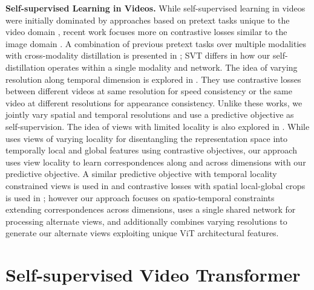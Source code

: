 \documentclass[10pt,twocolumn,letterpaper]{article}
\begin{document}
\textbf{Self-supervised Learning in Videos.}
While self-supervised learning in videos were initially dominated by approaches based on pretext tasks unique to the video domain \cite{mathieu2015deep, PatrauceanHC16, walker2016uncertain, pmlr-v37-srivastava15, Vondrick16a, vondrick2018tracking, Agrawal_2015_ICCV, Goroshin_2015_ICCV, DBLP:journals/corr/IsolaZKA15, Misra-2016-5596, 7410677}, recent work focuses more on contrastive losses similar to the image domain \cite{Feichtenhofer_large, han2019video, han2020self, qian2020spatiotemporal, hjelm2020representation, recasens2021broaden}. 
A combination of previous pretext tasks over multiple modalities with cross-modality distillation is presented in \cite{piergiovanni2020evolving};  SVT differs in how our self-distillation operates within a single modality and network.
The idea of varying resolution along temporal dimension is explored in \cite{Huang_2021_ICCV, chen2021rspnet}. They use contrastive losses between different videos at same resolution for speed consistency or the same video at different resolutions for appearance consistency. Unlike these works, we jointly vary spatial and temporal resolutions and use a predictive objective as self-supervision.  The idea of views with limited locality is also explored in \cite{Behrmann2021LongSV, recasens2021broaden, Dave2021TCLRTC}. While \cite{Behrmann2021LongSV} uses views of varying locality for disentangling the representation space into temporally local and global features using contrastive objectives, our approach uses view locality to learn correspondences along and across dimensions with our predictive objective. A similar predictive objective with temporal locality constrained views is used in \cite{recasens2021broaden} and contrastive losses with spatial local-global crops is used in \cite{Dave2021TCLRTC}; however our approach focuses on spatio-temporal constraints extending correspondences across dimensions, uses a single shared network for processing alternate views, and additionally combines varying resolutions to generate our alternate views exploiting unique ViT architectural features. 




 \section{Self-supervised Video Transformer}
\label{sec:method}
\end{document}
